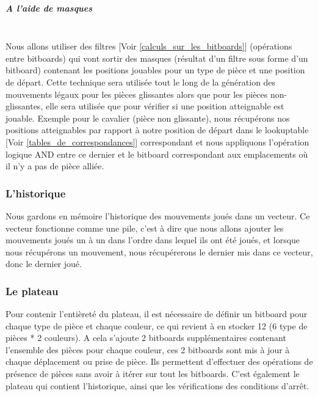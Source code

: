 \documentclass{article}
\begin{document}
\subparagraph{A l'aide de masques}
~~\\
\newline
Nous allons utiliser des filtres [Voir \ref{calculs_sur_les_bitboards}] (opérations entre bitboards) qui vont sortir des masques (résultat d'un filtre sous forme d'un bitboard)
contenant les positions jouables pour un type de pièce et une position de départ.\newline
Cette technique sera utilisée tout le long de la génération des mouvements légaux pour les pièces glissantes alors que pour les pièces non-glissantes, elle sera utilisée que pour vérifier si une position atteignable est jouable.\newline
Exemple pour le cavalier (pièce non glissante), nous récupérons nos positions atteignables par rapport à notre position de départ dans le lookuptable [Voir \ref{tables_de_correspondances}] correspondant et nous appliquons l'opération logique AND entre ce dernier et le bitboard correspondant aux emplacements où il n'y a pas de pièce alliée.

\subsubsection{L'historique} \label{L'historique}
Nous gardons en mémoire l'historique des mouvements joués dans un vecteur.\newline
Ce vecteur fonctionne comme une pile, c'est à dire que nous allons ajouter les mouvements joués un à un dans l'ordre dans lequel ils ont été joués, et lorsque nous récupérons un mouvement, nous récupérerons le dernier mis dans ce vecteur, donc le dernier joué.

\subsubsection{Le plateau} \label{implementation_plateau}
Pour contenir l'entièreté du plateau, il est nécessaire de définir un bitboard pour chaque type de pièce et chaque couleur, ce qui revient à en stocker 12 (6 type de pièces * 2 couleurs).
A cela s'ajoute 2 bitboards supplémentaires contenant l'ensemble des pièces pour chaque couleur, ces 2 bitboards sont mis à jour à chaque déplacement ou prise de pièce.
Ils permettent d'effectuer des opérations de présence de pièces sans avoir à itérer sur tout les bitboards. \newline
C'est également le plateau qui contient l'historique, ainsi que les vérifications des conditions d'arrêt.
\end{document}
